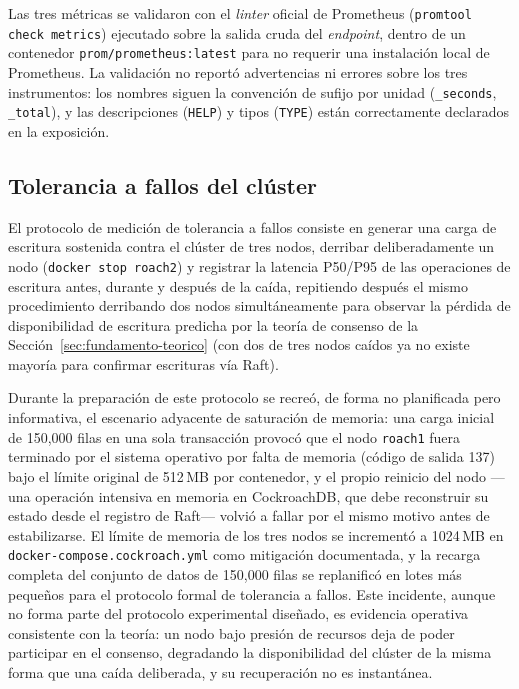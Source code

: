 Las tres métricas se validaron con el \emph{linter} oficial de Prometheus (\texttt{promtool check
metrics}) ejecutado sobre la salida cruda del \emph{endpoint}, dentro de un contenedor
\texttt{prom/prometheus:latest} para no requerir una instalación local de Prometheus. La
validación no reportó advertencias ni errores sobre los tres instrumentos: los nombres siguen la
convención de sufijo por unidad (\texttt{\_seconds}, \texttt{\_total}), y las descripciones
(\texttt{HELP}) y tipos (\texttt{TYPE}) están correctamente declarados en la exposición.

\subsection{Tolerancia a fallos del clúster}

El protocolo de medición de tolerancia a fallos consiste en generar una carga de escritura
sostenida contra el clúster de tres nodos, derribar deliberadamente un nodo
(\texttt{docker stop roach2}) y registrar la latencia P50/P95 de las operaciones de escritura
antes, durante y después de la caída, repitiendo después el mismo procedimiento derribando dos
nodos simultáneamente para observar la pérdida de disponibilidad de escritura predicha por la
teoría de consenso de la Sección~\ref{sec:fundamento-teorico} (con dos de tres nodos caídos ya no
existe mayoría para confirmar escrituras vía Raft).

Durante la preparación de este protocolo se recreó, de forma no planificada pero informativa, el
escenario adyacente de saturación de memoria: una carga inicial de 150{,}000 filas en una sola
transacción provocó que el nodo \texttt{roach1} fuera terminado por el sistema operativo por falta
de memoria (código de salida 137) bajo el límite original de 512\,MB por contenedor, y el propio
reinicio del nodo —una operación intensiva en memoria en CockroachDB, que debe reconstruir su
estado desde el registro de Raft— volvió a fallar por el mismo motivo antes de estabilizarse. El
límite de memoria de los tres nodos se incrementó a 1024\,MB en
\texttt{docker-compose.cockroach.yml} como mitigación documentada, y la recarga completa del
conjunto de datos de 150{,}000 filas se replanificó en lotes más pequeños para el protocolo formal
de tolerancia a fallos. Este incidente, aunque no forma parte del protocolo experimental
diseñado, es evidencia operativa consistente con la teoría: un nodo bajo presión de recursos deja
de poder participar en el consenso, degradando la disponibilidad del clúster de la misma forma
que una caída deliberada, y su recuperación no es instantánea.

